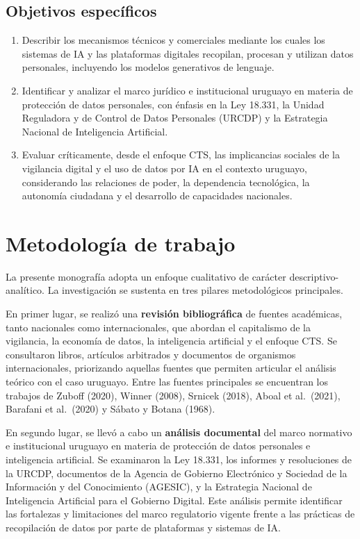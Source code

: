 \documentclass[11pt,a4paper]{article}
\begin{document}
\subsection{Objetivos específicos}

\begin{enumerate}
    \item Describir los mecanismos técnicos y comerciales mediante los cuales los sistemas de IA y las plataformas digitales recopilan, procesan y utilizan datos personales, incluyendo los modelos generativos de lenguaje.
    \item Identificar y analizar el marco jurídico e institucional uruguayo en materia de protección de datos personales, con énfasis en la Ley 18.331, la Unidad Reguladora y de Control de Datos Personales (URCDP) y la Estrategia Nacional de Inteligencia Artificial.
    \item Evaluar críticamente, desde el enfoque CTS, las implicancias sociales de la vigilancia digital y el uso de datos por IA en el contexto uruguayo, considerando las relaciones de poder, la dependencia tecnológica, la autonomía ciudadana y el desarrollo de capacidades nacionales.
\end{enumerate}

\section{Metodología de trabajo}

La presente monografía adopta un enfoque cualitativo de carácter descriptivo-analítico. La investigación se sustenta en tres pilares metodológicos principales.

En primer lugar, se realizó una \textbf{revisión bibliográfica} de fuentes académicas, tanto nacionales como internacionales, que abordan el capitalismo de la vigilancia, la economía de datos, la inteligencia artificial y el enfoque CTS. Se consultaron libros, artículos arbitrados y documentos de organismos internacionales, priorizando aquellas fuentes que permiten articular el análisis teórico con el caso uruguayo. Entre las fuentes principales se encuentran los trabajos de Zuboff (2020), Winner (2008), Srnicek (2018), Aboal et al.\ (2021), Barafani et al.\ (2020) y Sábato y Botana (1968).

En segundo lugar, se llevó a cabo un \textbf{análisis documental} del marco normativo e institucional uruguayo en materia de protección de datos personales e inteligencia artificial. Se examinaron la Ley 18.331, los informes y resoluciones de la URCDP, documentos de la Agencia de Gobierno Electrónico y Sociedad de la Información y del Conocimiento (AGESIC), y la Estrategia Nacional de Inteligencia Artificial para el Gobierno Digital. Este análisis permite identificar las fortalezas y limitaciones del marco regulatorio vigente frente a las prácticas de recopilación de datos por parte de plataformas y sistemas de IA.
\end{document}
